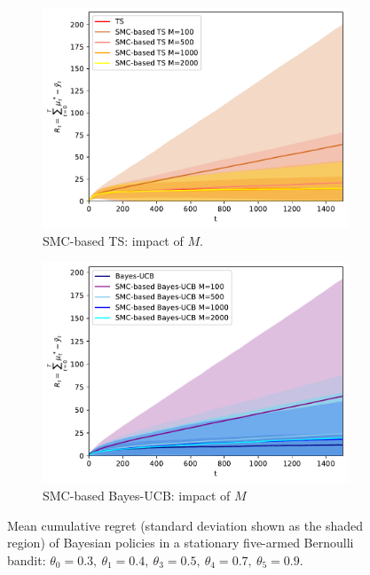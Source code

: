 \begin{figure}[!h]
	\begin{subfigure}[b]{0.46\textwidth}
		\centering
		\includegraphics[width=\textwidth]{./fods_figs/static/bernoulli/A5/theta0.3_0.4_0.5_0.7_0.9_allM_cumulative_regret_ts}
		\caption{SMC-based TS: impact of $M$.}
	\end{subfigure}
	\begin{subfigure}[b]{0.46\textwidth}
		\centering
		\includegraphics[width=\textwidth]{./fods_figs/static/bernoulli/A5/theta0.3_0.4_0.5_0.7_0.9_allM_cumulative_regret_bucb}
		\caption{SMC-based Bayes-UCB: impact of $M$}
	\end{subfigure}
	
	\caption{Mean cumulative regret (standard deviation shown as the shaded region) of Bayesian policies in a stationary five-armed Bernoulli bandit:
		 $\theta_0=0.3, \ \theta_1=0.4, \ \theta_3=0.5, \ \theta_4=0.7, \ \theta_5=0.9$.
	}
\end{figure}

